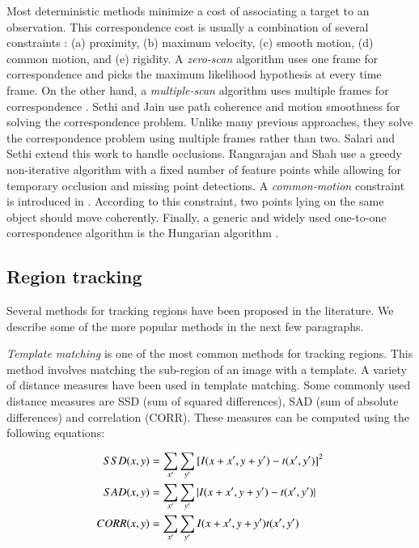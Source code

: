 Most deterministic methods minimize a cost of associating a target to an observation.  This correspondence cost is usually a combination of several constraints \cite{2006_JNL_SURVEYtrk_Yilmaz}: (a) proximity, (b) maximum velocity, (c) smooth motion, (d) common motion, and (e) rigidity.  A \emph{zero-scan} algorithm uses one frame for correspondence and picks the maximum likelihood hypothesis at every time frame.  On the other hand, a \emph{multiple-scan} algorithm uses multiple frames for correspondence \cite{1979_JNL_MTT_Reid}.    Sethi and Jain \cite{1987_JNL_FeatureTrajectories_Sethi} use path coherence and motion smoothness for solving the correspondence problem.  Unlike many previous approaches, they solve the correspondence problem using multiple frames rather than two.  Salari and Sethi \cite{1990_JNL_PointCorresp_Salari} extend this work to handle occlusions.  Rangarajan and Shah \cite{1991_JNL_MotionCorrespondence_Rangarajan} use a greedy non-iterative algorithm with a fixed number of feature points while allowing for temporary occlusion and missing point detections.  A \emph{common-motion} constraint is introduced in \cite{2001_JNL_MotionCorrespondence_Veenman}.  According to this constraint, two points lying on the same object should move coherently.  Finally, a generic and widely used one-to-one correspondence algorithm is the Hungarian algorithm \cite{1955_JNL_HungarianMethod_Kuhn}.

\subsection{Region tracking}
Several methods for tracking regions have been proposed in the literature.  We describe some of the more popular methods in the next few paragraphs.

\emph{Template matching} is one of the most common methods for tracking regions.  This method involves matching the sub-region of an image with a template.  A variety of distance measures have been used in template matching.  Some commonly used distance measures are SSD (sum of squared differences), SAD (sum of absolute differences) and correlation (CORR).  These measures can be computed using the following equations:


\begin{align}
SSD(x,y)  &=\sum_{x'}\sum_{y'} {[I(x+x', y+y')-t(x', y')]}^2 \notag\\
SAD(x,y)  &=\sum_{x'}\sum_{y'} |I(x+x', y+y')-t(x', y')| \\
CORR(x,y) &=\sum_{x'}\sum_{y'} I(x+x', y+y') t(x', y') \notag
\end{align}

